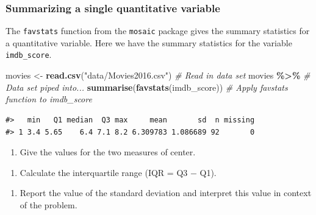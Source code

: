 \documentclass[
]{report}
\newenvironment{Shaded}{\begin{snugshade}}{\end{snugshade}}
\newcommand{\CommentTok}[1]{\textcolor[rgb]{0.56,0.35,0.01}{\textit{#1}}}
\newcommand{\KeywordTok}[1]{\textcolor[rgb]{0.13,0.29,0.53}{\textbf{#1}}}
\newcommand{\NormalTok}[1]{#1}
\newcommand{\OperatorTok}[1]{\textcolor[rgb]{0.81,0.36,0.00}{\textbf{#1}}}
\newcommand{\StringTok}[1]{\textcolor[rgb]{0.31,0.60,0.02}{#1}}
\providecommand{\tightlist}{%
  \setlength{\itemsep}{0pt}\setlength{\parskip}{0pt}}
\begin{document}
\vspace{.5in}

\hypertarget{summarizing-a-single-quantitative-variable}{%
\subsubsection*{Summarizing a single quantitative variable}\label{summarizing-a-single-quantitative-variable}}

The \texttt{favstats} function from the \texttt{mosaic} package gives the summary statistics for a quantitative variable. Here we have the summary statistics for the variable \texttt{imdb\_score}.

\begin{Shaded}
\begin{Highlighting}[]
\NormalTok{movies \textless{}{-}}\StringTok{ }\KeywordTok{read.csv}\NormalTok{(}\StringTok{"data/Movies2016.csv"}\NormalTok{) }\CommentTok{\# Read in data set}
\NormalTok{movies }\OperatorTok{\%\textgreater{}\%}\StringTok{ }\CommentTok{\# Data set piped into...}
\StringTok{  }\KeywordTok{summarise}\NormalTok{(}\KeywordTok{favstats}\NormalTok{(imdb\_score)) }\CommentTok{\# Apply favstats function to imdb\_score}
\end{Highlighting}
\end{Shaded}

\begin{verbatim}
#>   min   Q1 median  Q3 max     mean       sd  n missing
#> 1 3.4 5.65    6.4 7.1 8.2 6.309783 1.086689 92       0
\end{verbatim}

\begin{enumerate}
\def\labelenumi{\arabic{enumi}.}
\setcounter{enumi}{3}
\tightlist
\item
  Give the values for the two measures of center.
\end{enumerate}

\vspace{0.5in}

\begin{enumerate}
\def\labelenumi{\arabic{enumi}.}
\setcounter{enumi}{4}
\tightlist
\item
  Calculate the interquartile range (IQR = Q3 \(-\) Q1).
\end{enumerate}

\vspace{0.5in}

\begin{enumerate}
\def\labelenumi{\arabic{enumi}.}
\setcounter{enumi}{5}
\tightlist
\item
  Report the value of the standard deviation and interpret this value in context of the problem.
  \vspace{1in}
\end{enumerate}
\end{document}
